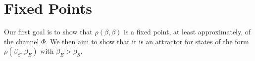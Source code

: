 \documentclass{article}
\begin{document}
\section{Fixed Points}
Our first goal is to show that $\rho(\beta, \beta)$ is a fixed point, at least approximately, of the channel $\Phi$. We then aim to show that it is an attractor for states of the form $\rho(\beta_S, \beta_E)$ with $\beta_E > \beta_S$. 
\end{document}
